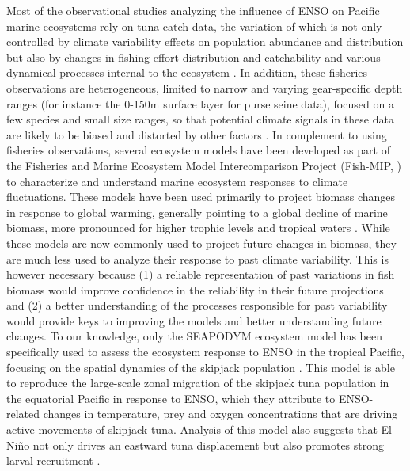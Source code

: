 Most of the observational studies analyzing the influence of ENSO on Pacific marine ecosystems rely on tuna catch data, the variation of which is not only controlled by climate variability effects on population abundance and distribution but also by changes in fishing effort distribution and catchability and various dynamical processes internal to the ecosystem \citep{hobdayDetectingClimateImpacts2013}. In addition, these fisheries observations are heterogeneous, limited to narrow and varying gear-specific depth ranges (for instance the 0-150m surface layer for purse seine data), focused on a few species and small size ranges, so that potential climate signals in these data are likely to be biased and distorted by other factors \citep{hobdayDetectingClimateImpacts2013}. In complement to using fisheries observations, several ecosystem models have been developed as part of the Fisheries and Marine Ecosystem Model Intercomparison Project (Fish-MIP, \citealp{tittensorProtocolIntercomparisonMarine2018}) to characterize and understand marine ecosystem responses to climate fluctuations. These models have been used primarily to project biomass changes in response to global warming, generally pointing to a global decline of marine biomass, more pronounced for higher trophic levels and tropical waters \citep{lotzeGlobalEnsembleProjections2019, tittensorNextgenerationEnsembleProjections2021}. While these models are now commonly used to project future  changes in biomass, they are much less used to analyze their response to past climate variability. This is however necessary because (1) a reliable representation of past variations in fish biomass would improve confidence in the reliability in their future projections and (2) a better understanding of the processes responsible for past variability would provide keys to improving the models and better understanding future changes. To our knowledge, only the SEAPODYM \citep{lehodeySpatialEcosystemPopulations2008} ecosystem model has been specifically used to assess the ecosystem response to ENSO in the tropical Pacific, focusing on the spatial dynamics of the skipjack population \citep{lehodeyPelagicEcosystemTropical2001}. This model is able to reproduce the large-scale zonal migration of the skipjack tuna population in the equatorial Pacific in response to ENSO, which they attribute to ENSO-related changes in temperature, prey and oxygen concentrations that are driving active movements of skipjack tuna. Analysis of this model also suggests that El Niño not only drives an eastward tuna displacement but also promotes  strong larval recruitment \citep{seninaParameterEstimationBasinscale2008}. 
